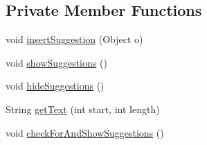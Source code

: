 \subsection*{Private Member Functions}
\begin{DoxyCompactItemize}
\item 
void \hyperlink{classqlib_1_1ide_1_1AutoComplete_af2b5cb3b8c9557abaed28883288f5f34}{insert\+Suggestion} (Object o)
\item 
void \hyperlink{classqlib_1_1ide_1_1AutoComplete_a9b4c1fc14bdff51a29b3a13622cba025}{show\+Suggestions} ()
\item 
void \hyperlink{classqlib_1_1ide_1_1AutoComplete_a262b15fe050727186b0dc3d22e0d5143}{hide\+Suggestions} ()
\item 
String \hyperlink{classqlib_1_1ide_1_1AutoComplete_acdc8c857e1580998523ee6f50c738a84}{get\+Text} (int start, int length)
\item 
void \hyperlink{classqlib_1_1ide_1_1AutoComplete_a04a7f33c4d243d3d15592c3b0b1b19d4}{check\+For\+And\+Show\+Suggestions} ()
\end{DoxyCompactItemize}
